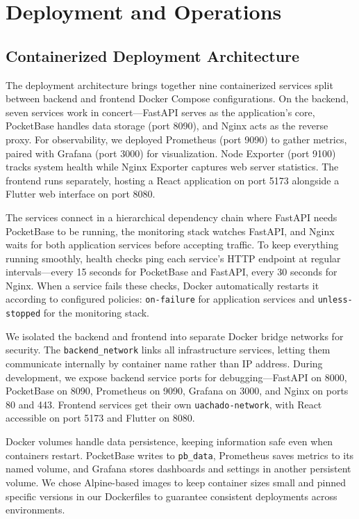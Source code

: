 \chapter{Deployment and Operations}
\label{chapter:deployment_operations}


\section{Containerized Deployment Architecture} \label{section:container_deployment}

The deployment architecture brings together nine containerized services split between backend and frontend Docker Compose configurations. On the backend, seven services work in concert—FastAPI serves as the application's core, PocketBase handles data storage (port 8090), and Nginx acts as the reverse proxy. For observability, we deployed Prometheus (port 9090) to gather metrics, paired with Grafana (port 3000) for visualization. Node Exporter (port 9100) tracks system health while Nginx Exporter captures web server statistics. The frontend runs separately, hosting a React application on port 5173 alongside a Flutter web interface on port 8080.

The services connect in a hierarchical dependency chain where FastAPI needs PocketBase to be running, the monitoring stack watches FastAPI, and Nginx waits for both application services before accepting traffic. To keep everything running smoothly, health checks ping each service's HTTP endpoint at regular intervals—every 15 seconds for PocketBase and FastAPI, every 30 seconds for Nginx. When a service fails these checks, Docker automatically restarts it according to configured policies: \texttt{on-failure} for application services and \texttt{unless-stopped} for the monitoring stack.

We isolated the backend and frontend into separate Docker bridge networks for security. The \texttt{backend\_network} links all infrastructure services, letting them communicate internally by container name rather than IP address. During development, we expose backend service ports for debugging—FastAPI on 8000, PocketBase on 8090, Prometheus on 9090, Grafana on 3000, and Nginx on ports 80 and 443. Frontend services get their own \texttt{uachado-network}, with React accessible on port 5173 and Flutter on 8080.

Docker volumes handle data persistence, keeping information safe even when containers restart. PocketBase writes to \texttt{pb\_data}, Prometheus saves metrics to its named volume, and Grafana stores dashboards and settings in another persistent volume. We chose Alpine-based images to keep container sizes small and pinned specific versions in our Dockerfiles to guarantee consistent deployments across environments.

